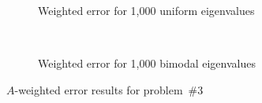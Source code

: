 \begin{figure}[p]
  \centering
  \begin{subfigure}[t]{0.45\textwidth}
    \centering
    
    \caption{\scriptsize Weighted error for 1,000 uniform eigenvalues}\label{fig:p03:uniformWeightedErr}
  \end{subfigure}
  ~
  \begin{subfigure}[t]{0.45\textwidth}
    \centering
    
    \caption{\scriptsize Weighted error for 1,000 bimodal eigenvalues}\label{fig:p03:bimodalWeightedErr}
  \end{subfigure}
  \caption{$A$-weighted error results for problem~\#3}
\end{figure}
\clearpage